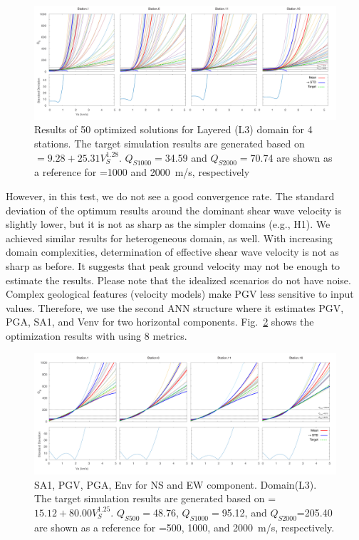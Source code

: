   \begin{figure}[ht]
    \centering
    \includegraphics[width=\textwidth]{figures/pdf/Figure_17-L3-pgv.pdf}
    \caption{Results of 50 optimized solutions for Layered (L3) domain for 4 stations. The target simulation results are generated based on \qs{}$=9.28+25.31V_{S}^{1.28}$. $Q_{S1000}=$34.59 and $Q_{S2000}=$70.74 are shown as a reference for \vs{}=1000 and 2000~m/s, respectively}
    \label{fig:station_1_2000_1000_500_L3_nt}
\end{figure}

However, in this test, we do not see a good convergence rate. The standard deviation of the optimum results around the dominant shear wave velocity is slightly lower, but it is not as sharp as the simpler domains (e.g., H1). We achieved similar results for heterogeneous domain, as well. With increasing domain complexities, determination of effective shear wave velocity is not as sharp as before. It suggests that peak ground velocity may not be enough to estimate the results. Please note that the idealized scenarios do not have noise. Complex geological features (velocity models) make PGV less sensitive to input values. Therefore, we use the second ANN structure where it estimates PGV, PGA, SA1, and Venv for two horizontal components. Fig.~\ref{fig:station_8_param_2000_1000_500} shows the optimization results with using 8 metrics. 

  \begin{figure}[ht]
    \centering
    \includegraphics[width=\textwidth]{figures/pdf/Figure_18-L3-8metric.pdf}
    \caption{SA1, PGV, PGA, Env for NS and EW component. Domain(L3). The target simulation results are generated based on \qs{}=$15.12+80.00V_{S}^{1.25}$. $Q_{S500}=$48.76, $Q_{S1000}=$95.12, and $Q_{S2000}$=205.40 are shown as a reference for \vs{}=500, 1000, and 2000~m/s, respectively.}
    \label{fig:station_8_param_2000_1000_500}
\end{figure}

